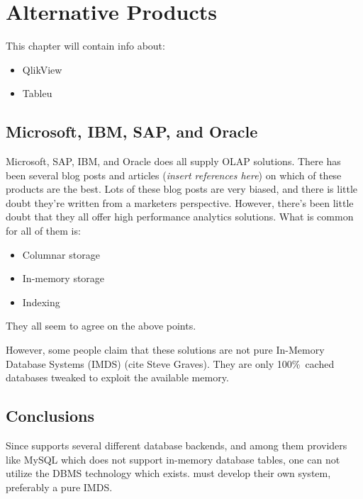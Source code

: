 \chapter{Alternative Products}
\label{chap:alternative-products}

This chapter will contain info about:

\begin{itemize}
  \item QlikView
  \item Tableu
\end{itemize}

\section{Microsoft, IBM, SAP, and Oracle}
Microsoft, SAP, IBM, and Oracle does all supply OLAP solutions. There has been several blog posts and articles (\textit{insert references here}) on which of these products are the best. Lots of these blog posts are very biased, and there is little doubt they're written from a marketers perspective. However, there's been little doubt that they all offer high performance analytics solutions. What is common for all of them is:
\begin{itemize}
  \item Columnar storage
  \item In-memory storage
  \item Indexing
\end{itemize}

They all seem to agree on the above points.

However, some people claim that these solutions are not pure In-Memory Database Systems (IMDS) (cite Steve Graves). They are only 100\%~cached databases tweaked to exploit the available memory.

\section{Conclusions}
\label{sec:Conclusions}
Since \genusSoftware supports several different database backends, and among them providers like MySQL which does not support in-memory database tables, one can not utilize the DBMS technology which exists. \genus must develop their own system, preferably a pure IMDS.
